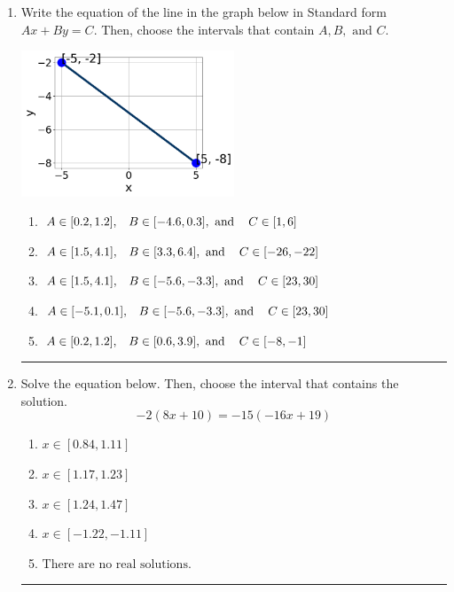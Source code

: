 \documentclass[14pt]{extbook}
\newcommand{\litem}[1]{\item#1\hspace*{-1cm}\rule{\textwidth}{0.4pt}}
\begin{document}
\begin{enumerate}
\litem{
Write the equation of the line in the graph below in Standard form $Ax+By=C$. Then, choose the intervals that contain $A, B, \text{ and } C$.
\begin{center}
    \includegraphics[width=0.5\textwidth]{../Figures/linearGraphToStandardCopyA.png}
\end{center}
\begin{enumerate}[label=\Alph*.]
\item \( A \in [0.2, 1.2], \hspace{3mm} B \in [-4.6, 0.3], \text{ and } \hspace{3mm} C \in [1, 6] \)
\item \( A \in [1.5, 4.1], \hspace{3mm} B \in [3.3, 6.4], \text{ and } \hspace{3mm} C \in [-26, -22] \)
\item \( A \in [1.5, 4.1], \hspace{3mm} B \in [-5.6, -3.3], \text{ and } \hspace{3mm} C \in [23, 30] \)
\item \( A \in [-5.1, 0.1], \hspace{3mm} B \in [-5.6, -3.3], \text{ and } \hspace{3mm} C \in [23, 30] \)
\item \( A \in [0.2, 1.2], \hspace{3mm} B \in [0.6, 3.9], \text{ and } \hspace{3mm} C \in [-8, -1] \)

\end{enumerate} }
\litem{
Solve the equation below. Then, choose the interval that contains the solution.\[ -2(8x + 10) = -15(-16x + 19) \]\begin{enumerate}[label=\Alph*.]
\item \( x \in [0.84, 1.11] \)
\item \( x \in [1.17, 1.23] \)
\item \( x \in [1.24, 1.47] \)
\item \( x \in [-1.22, -1.11] \)
\item \( \text{There are no real solutions.} \)


\end{enumerate}}
\end{enumerate}
\end{document}
